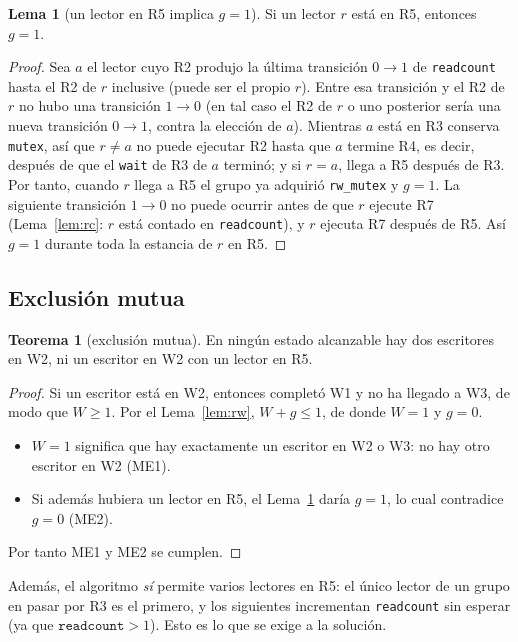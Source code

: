 \documentclass[12pt,letterpaper]{article}
\theoremstyle{definition}
\newtheorem{lema}{Lema}
\newtheorem{teorema}{Teorema}
\newcommand{\sem}[1]{\texttt{#1}}
\begin{document}
\begin{lema}[un lector en R5 implica $g=1$]\label{lem:g}
Si un lector $r$ está en R5, entonces $g = 1$.
\end{lema}
\begin{proof}
Sea $a$ el lector cuyo R2 produjo la última transición $0\to1$ de \sem{readcount} hasta el R2 de $r$ inclusive (puede ser el propio $r$). Entre esa transición y el R2 de $r$ no hubo una transición $1\to0$ (en tal caso el R2 de $r$ o uno posterior sería una nueva transición $0\to1$, contra la elección de $a$). Mientras $a$ está en R3 conserva \sem{mutex}, así que $r\neq a$ no puede ejecutar R2 hasta que $a$ termine R4, es decir, después de que el \sem{wait} de R3 de $a$ terminó; y si $r=a$, llega a R5 después de R3. Por tanto, cuando $r$ llega a R5 el grupo ya adquirió \sem{rw\_mutex} y $g=1$. La siguiente transición $1\to0$ no puede ocurrir antes de que $r$ ejecute R7 (Lema~\ref{lem:rc}: $r$ está contado en \sem{readcount}), y $r$ ejecuta R7 después de R5. Así $g=1$ durante toda la estancia de $r$ en R5.
\end{proof}

\subsection{Exclusión mutua}
\begin{teorema}[exclusión mutua]\label{teo:me}
En ningún estado alcanzable hay dos escritores en W2, ni un escritor en W2 con un lector en R5.
\end{teorema}
\begin{proof}
Si un escritor está en W2, entonces completó W1 y no ha llegado a W3, de modo que $W\ge 1$. Por el Lema~\ref{lem:rw}, $W+g\le 1$, de donde $W = 1$ y $g = 0$.
\begin{itemize}[itemsep=2pt]
\item $W = 1$ significa que hay exactamente un escritor en W2 o W3: no hay otro escritor en W2 (ME1).
\item Si además hubiera un lector en R5, el Lema~\ref{lem:g} daría $g = 1$, lo cual contradice $g=0$ (ME2).
\end{itemize}
Por tanto ME1 y ME2 se cumplen. \qedhere
\end{proof}

Además, el algoritmo \emph{sí} permite varios lectores en R5: el único lector de un grupo en pasar por R3 es el primero, y los siguientes incrementan \sem{readcount} sin esperar (ya que $\texttt{readcount}>1$). Esto es lo que se exige a la solución.
\end{document}
